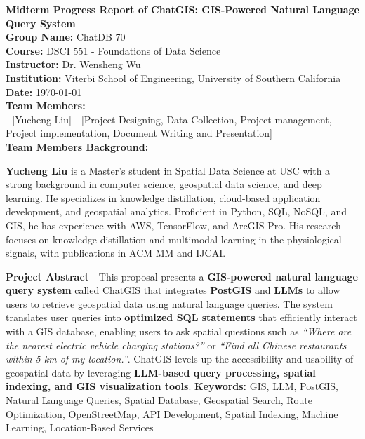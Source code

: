 \documentclass{article}
\begin{document}
\begin{titlepage}
    \centering
    \vspace*{2cm}
    {\Huge \textbf{Midterm Progress Report of ChatGIS: GIS-Powered Natural Language Query System}} \\
    \vspace{1.5cm}
    \textbf{Group Name:} ChatDB 70 \\
    \textbf{Course:} DSCI 551 - Foundations of Data Science \\
    \textbf{Instructor:} Dr. Wensheng Wu \\
    \textbf{Institution:} Viterbi School of Engineering, University of Southern California \\
    \textbf{Date:} \today \\
    \vfill
    \textbf{Team Members:} \\
    - [Yucheng Liu] - [Project Designing, Data Collection, Project management, Project implementation,  Document Writing and Presentation] \\
    

    \vfill
    \textbf{Team Members Background:} \\
    \begin{justify}

        \textbf{Yucheng Liu} is a Master’s student in Spatial Data Science at USC with a strong background in computer science, geospatial data science, and deep learning. He specializes in knowledge distillation, cloud-based application development, and geospatial analytics. Proficient in Python, SQL, NoSQL, and GIS, he has experience with AWS, TensorFlow,  and ArcGIS Pro. His research focuses on knowledge distillation and multimodal learning in the physiological signals, with publications in ACM MM and IJCAI.
        
    \end{justify}

    \vfill
    \begin{justify}
        \textbf{Project Abstract} - This proposal presents a \textbf{GIS-powered natural language query system} called ChatGIS that integrates \textbf{PostGIS} and \textbf{LLMs} to allow users to retrieve geospatial data using natural language queries. The system translates user queries into \textbf{optimized SQL statements} that efficiently interact with a GIS database, enabling users to ask spatial questions such as \textit{``Where are the nearest electric vehicle charging stations?''} or \textit{``Find all Chinese restaurants within 5 km of my location.''}. ChatGIS levels up the accessibility and usability of geospatial data by leveraging \textbf{LLM-based query processing, spatial indexing, and GIS visualization tools}.
        \vfill
        \textbf{Keywords:} GIS, LLM, PostGIS, Natural Language Queries, Spatial Database, Geospatial Search, Route Optimization, OpenStreetMap, API Development, Spatial Indexing, Machine Learning, Location-Based Services
    \end{justify}

\end{titlepage}
\end{document}
